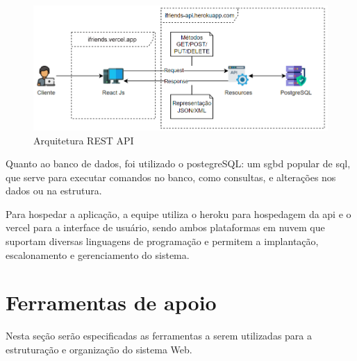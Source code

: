 \begin{figure}[htb]
\centering
\caption{Arquitetura REST API}
\label{Arquitetura_Rest_API}
\includegraphics[width=1.0\textwidth]{anexos/Imagens_Diagramas/Arquitetura-Rest-API.png}
\end{figure}
\FloatBarrier

Quanto ao banco de dados, foi utilizado o \gls{postegreSQL}: um \acs{sgbd} popular de \acs{sql}, que serve para executar comandos no banco, como consultas, e alterações nos dados ou na estrutura.

Para hospedar a aplicação, a equipe utiliza o \gls{heroku} para hospedagem da \acs{api} e o \gls{vercel} para a interface de usuário, sendo ambos plataformas em nuvem que suportam diversas linguagens de programação e permitem a implantação, escalonamento e gerenciamento do sistema.

\section{Ferramentas de apoio}
Nesta seção serão especificadas as ferramentas a serem utilizadas para a estruturação e organização do sistema Web.

